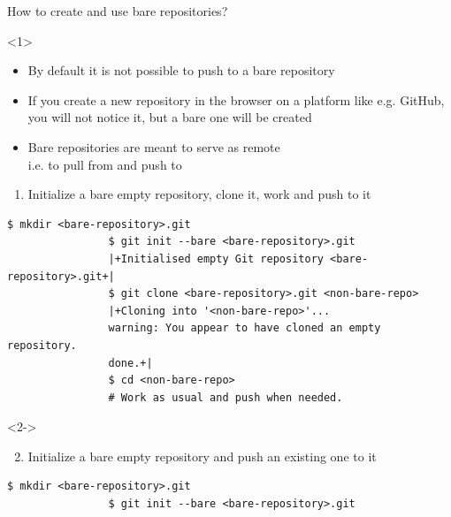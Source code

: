 \documentclass[usenames,svgnames,14pt]{beamer}
\newcommand{\then}{\raisebox{2pt}{$\;\drsh\;$}}
\begin{document}
\begin{frame}[fragile]{How to create and use bare repositories?}
    \setlength{\leftmarginii}{8mm}
    \vspace{-6mm}
    \begin{overlayarea}{\textwidth}{0.8\textheight}
        \begin{onlyenv}<1>
            \vspace{1mm}
            \begin{itemize}
                \item By default it is not possible to push to a bare repository
                \item If you create a new repository in the browser on a platform like e.g. GitHub, you will not notice it, but a bare one will be created
                \item \alert{Bare repositories are meant} to serve as remote\\ \then i.e. \alert{to pull from and push to}
            \end{itemize}
            \begin{enumerate}
                \item Initialize a bare empty repository, clone it, work and push to it
            \end{enumerate}
            \begin{lstlisting}[style=MyBash]
                $ mkdir <bare-repository>.git
                $ git init --bare <bare-repository>.git
                |+Initialised empty Git repository <bare-repository>.git+|
                $ git clone <bare-repository>.git <non-bare-repo>
                |+Cloning into '<non-bare-repo>'...
                warning: You appear to have cloned an empty repository.
                done.+|
                $ cd <non-bare-repo>
                # Work as usual and push when needed.
            \end{lstlisting}
        \end{onlyenv}
        \begin{onlyenv}<2->
            \begin{enumerate}
                \setcounter{enumi}{1}
                \item Initialize a bare empty repository and push an existing one to it
            \end{enumerate}
            \begin{lstlisting}[style=MyBash]
                $ mkdir <bare-repository>.git
                $ git init --bare <bare-repository>.git

\end{lstlisting}
\end{onlyenv}
\end{overlayarea}
\end{frame}
\end{document}
